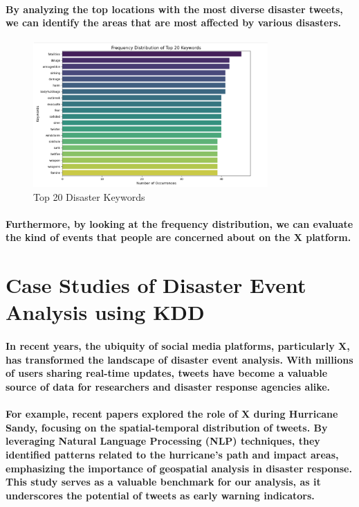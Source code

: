 \documentclass{article}
\begin{document}
\paragraph{By analyzing the top locations with the most diverse disaster tweets, we can identify the areas that are most affected by various disasters.}
\begin{figure}[h]
    \centering
    \includegraphics[width=0.8\textwidth]{top_20_disaster_keywords.png} 
    \caption{Top 20 Disaster Keywords}
    \label{fig:my_label}
\end{figure}
\paragraph{Furthermore, by looking at the frequency distribution, we can evaluate the kind of events that people are concerned about on the X platform.}
\section{Case Studies of Disaster Event Analysis using KDD}
\paragraph{In recent years, the ubiquity of social media platforms, particularly X, has transformed the landscape of disaster event analysis. With millions of users sharing real-time updates, tweets have become a valuable source of data for researchers and disaster response agencies alike.}
\paragraph{For example, recent papers \cite{nastaran_pourebrahim_ccfadf88} explored the role of X during Hurricane Sandy, focusing on the spatial-temporal distribution of tweets. By leveraging Natural Language Processing (NLP) techniques, they identified patterns related to the hurricane's path and impact areas, emphasizing the importance of geospatial analysis in disaster response. This study serves as a valuable benchmark for our analysis, as it underscores the potential of tweets as early warning indicators.}
\end{document}
